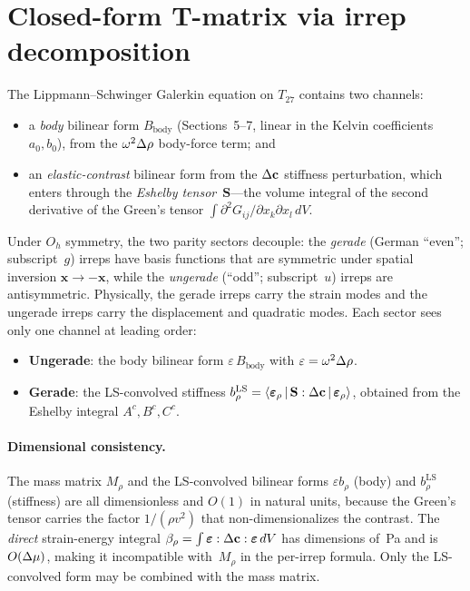 \section{Closed-form T-matrix via irrep decomposition}
\label{sec:closedform-tmatrix}

The Lippmann--Schwinger Galerkin equation on $T_{27}$ contains two
channels:
\begin{itemize}
\item a \emph{body} bilinear form $B_{\text{body}}$
  (Sections~5--7, linear in the Kelvin coefficients $a_0, b_0$),
  from the $\omega^2\Delta\rho$ body-force term; and
\item an \emph{elastic-contrast} bilinear form from the $\Delta\mathbf{c}$
  stiffness perturbation, which enters through the \emph{Eshelby
  tensor}~$\mathbf{S}$---the volume integral of the second derivative
  of the Green's tensor $\int\partial^2 G_{ij}/\partial x_k\partial x_l\,dV$.
\end{itemize}

Under $O_h$ symmetry, the two parity sectors decouple: the
\emph{gerade} (German ``even''; subscript~$g$) irreps have basis
functions that are symmetric under spatial inversion
$\mathbf{x} \to -\mathbf{x}$, while the \emph{ungerade} (``odd'';
subscript~$u$) irreps are antisymmetric.  Physically, the gerade
irreps carry the strain modes and the ungerade irreps carry the
displacement and quadratic modes.  Each sector sees only one channel
at leading order:
\begin{itemize}
\item \textbf{Ungerade}: the body bilinear form
  $\varepsilon\,B_{\text{body}}$ with $\varepsilon = \omega^2\Delta\rho$.
\item \textbf{Gerade}: the LS-convolved stiffness
  $b^{\text{LS}}_\rho = \langle\boldsymbol{\varepsilon}_\rho
  \,|\,\mathbf{S}:\Delta\mathbf{c}\,|\,\boldsymbol{\varepsilon}_\rho\rangle$,
  obtained from the Eshelby integral $A^c, B^c, C^c$.
\end{itemize}

\paragraph{Dimensional consistency.}
The mass matrix $M_\rho$ and the LS-convolved bilinear forms
$\varepsilon b_\rho$ (body) and $b^{\text{LS}}_\rho$ (stiffness) are
all dimensionless and $O(1)$ in natural units, because the Green's
tensor carries the factor $1/(\rho v^2)$ that non-dimensionalizes
the contrast.  The \emph{direct} strain-energy integral
$\beta_\rho = \int\boldsymbol{\varepsilon}:\Delta\mathbf{c}:\boldsymbol{\varepsilon}\,dV$
has dimensions of~Pa and is $O(\Delta\mu)$, making it incompatible with~$M_\rho$
in the per-irrep formula.  Only the LS-convolved form may be combined
with the mass matrix.

